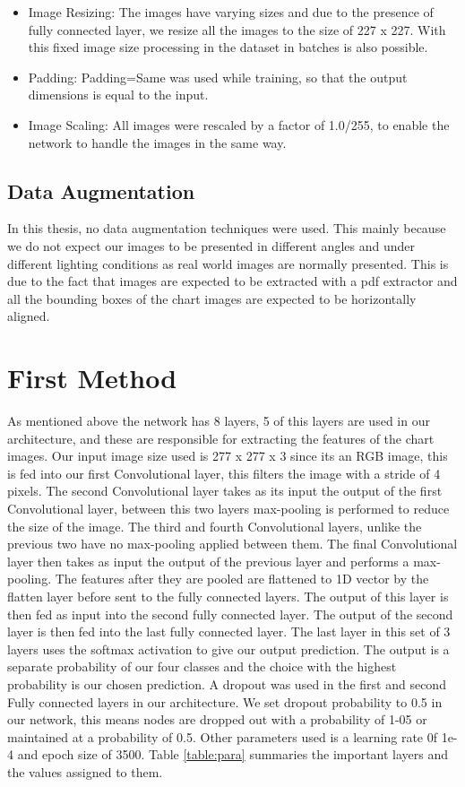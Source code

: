 \documentclass[12pt, a4paper,oneside]{report}
\begin{document}
\begin{itemize}
	\item  Image Resizing: The images have varying sizes and due to the presence of fully connected layer, we resize all the images to the size of 227 x 227. With this fixed image size processing in the dataset in batches is also possible.
	
	\item  Padding: Padding=Same was used while training, so that the output dimensions is equal to the input.
	
	\item  Image Scaling: All images were rescaled by a factor of 1.0/255, to enable the network to handle the images in the same way.
	
\end{itemize}

\subsection{Data Augmentation}
In this thesis, no data augmentation techniques were used. This mainly because we do not expect our images to be presented in different angles and under different lighting conditions as real world images are normally presented. This is due to the fact that images are expected to be extracted with a pdf extractor and all the bounding boxes of the chart images are expected to be horizontally aligned.  

\section{First Method}
As mentioned above the network has 8 layers, 5 of this layers are used in our architecture, and these are responsible for extracting the  features of the chart images. Our input image size used is 277 x 277 x 3  since its an RGB image, this is fed into our first Convolutional layer, this filters the image with a stride of 4 pixels. The second Convolutional layer takes as its input the output of the first Convolutional layer, between this two layers max-pooling is performed to reduce the size of the image. The third and fourth Convolutional layers, unlike the previous two have no max-pooling applied between them. The final Convolutional layer then takes as input the output of the previous layer and performs a max-pooling. The features after they are pooled are flattened to 1D vector by the flatten layer before sent to the fully connected layers. The output of this layer is then fed as input into the second fully connected layer. The output of the second layer is then fed into the last fully connected layer. The last layer in this set of 3 layers uses the softmax activation to give our output prediction. The output is a separate probability of our four classes and the choice with the highest probability is our chosen prediction. A dropout was used in the first and second Fully connected layers in our architecture. We set dropout probability to 0.5 in our network, this means nodes are dropped out with a probability of 1-05 or maintained at a probability of 0.5. Other parameters used is a learning rate 0f 1e-4 and epoch size of 3500. Table \ref{table:para} summaries the important layers and the values assigned to them.
\end{document}
